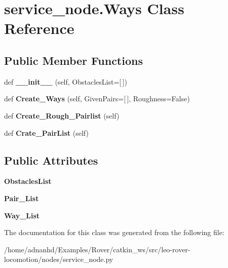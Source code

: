\hypertarget{classservice__node_1_1Ways}{}\section{service\+\_\+node.\+Ways Class Reference}
\label{classservice__node_1_1Ways}
\subsection*{Public Member Functions}
\begin{DoxyCompactItemize}
\item 
\mbox{\label{classservice__node_1_1Ways_a23b0cca4c00cb5d6eb8353f975abdaa9}} 
def {\bfseries \+\_\+\+\_\+init\+\_\+\+\_\+} (self, Obstacles\+List=\mbox{[}$\,$\mbox{]})
\item 
\mbox{\label{classservice__node_1_1Ways_a009a171b44beb3f775c37d2e18f4badb}} 
def {\bfseries Create\+\_\+\+Ways} (self, Given\+Pairs=\mbox{[}$\,$\mbox{]}, Roughness=False)
\item 
\mbox{\label{classservice__node_1_1Ways_a8d0b68914c8d52000d90c03de96ca119}} 
def {\bfseries Create\+\_\+\+Rough\+\_\+\+Pairlist} (self)
\item 
\mbox{\label{classservice__node_1_1Ways_a4cf472859a8fa9f89afce2246418e330}} 
def {\bfseries Crate\+\_\+\+Pair\+List} (self)
\end{DoxyCompactItemize}
\subsection*{Public Attributes}
\begin{DoxyCompactItemize}
\item 
\mbox{\label{classservice__node_1_1Ways_ad3b57750e0d578e2da73de6d80c29fda}} 
{\bfseries Obstacles\+List}
\item 
\mbox{\label{classservice__node_1_1Ways_ae421040938dcf4b3e2cfd9d2ad41a3a2}} 
{\bfseries Pair\+\_\+\+List}
\item 
\mbox{\label{classservice__node_1_1Ways_a0d7a6bc83ce1c142fd14ac561bab8266}} 
{\bfseries Way\+\_\+\+List}
\end{DoxyCompactItemize}


The documentation for this class was generated from the following file\+:\begin{DoxyCompactItemize}
\item 
/home/adnanhd/\+Examples/\+Rover/catkin\+\_\+ws/src/leo-\/rover-\/locomotion/nodes/service\+\_\+node.\+py\end{DoxyCompactItemize}
